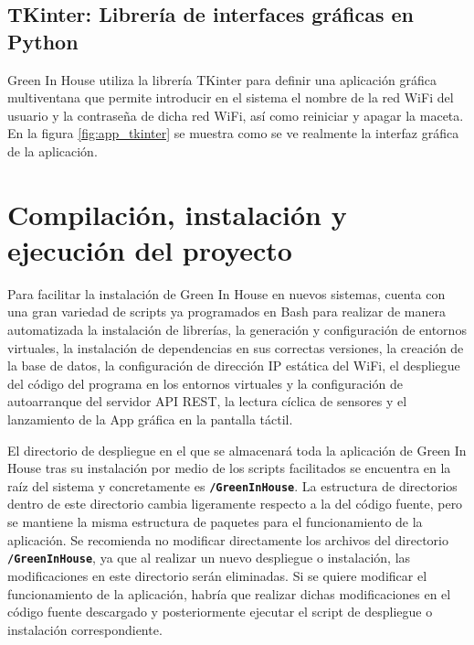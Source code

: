     \subsection{TKinter:  Librería de interfaces gráficas en Python}
    Green In House utiliza la librería TKinter \cite{wiki:tkinter} para definir una aplicación gráfica multiventana que permite introducir en el sistema el nombre de la red WiFi del usuario y la contraseña de dicha red WiFi, así como reiniciar y apagar la maceta. En la figura \ref{fig:app_tkinter} se muestra como se ve realmente la interfaz gráfica de la aplicación.

\section{Compilación, instalación y ejecución del proyecto}
Para facilitar la instalación de Green In House en nuevos sistemas, cuenta con una gran variedad de scripts ya programados en Bash para realizar de manera automatizada la instalación de librerías, la generación y configuración de entornos virtuales, la instalación de dependencias en sus correctas versiones, la creación de la base de datos, la configuración de dirección IP estática del WiFi, el despliegue del código del programa en los entornos virtuales y la configuración de autoarranque del servidor API REST, la lectura cíclica de sensores y el lanzamiento de la App gráfica en la pantalla táctil.

El directorio de despliegue en el que se almacenará toda la aplicación de Green In House tras su instalación por medio de los scripts facilitados se encuentra en la raíz del sistema y concretamente es \textbf{\texttt{/GreenInHouse}}. La estructura de directorios dentro de este directorio cambia ligeramente respecto a la del código fuente, pero se mantiene la misma estructura de paquetes para el funcionamiento de la aplicación. Se recomienda no modificar directamente los archivos del directorio \textbf{\texttt{/GreenInHouse}}, ya que al realizar un nuevo despliegue o instalación, las modificaciones en este directorio serán eliminadas. Si se quiere modificar el funcionamiento de la aplicación, habría que realizar dichas modificaciones en el código fuente descargado y posteriormente ejecutar el script de despliegue o instalación correspondiente.


